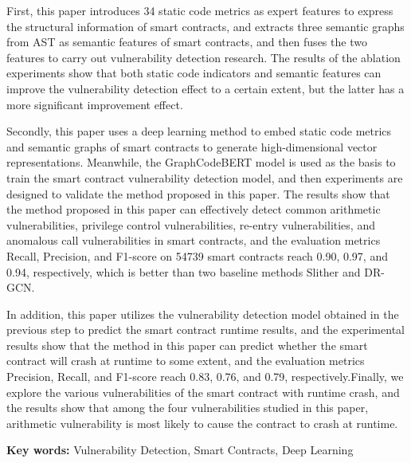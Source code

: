 First, this paper introduces 34 static code metrics as expert features to express the structural information of smart contracts, and extracts three semantic graphs from AST as semantic features of smart contracts, and then fuses the two features to carry out vulnerability detection research. The results of the ablation experiments show that both static code indicators and semantic features can improve the vulnerability detection effect to a certain extent, but the latter has a more significant improvement effect.

Secondly, this paper uses a deep learning method to embed static code metrics and semantic graphs of smart contracts to generate high-dimensional vector representations. Meanwhile, the GraphCodeBERT model is used as the basis to train the smart contract vulnerability detection model, and then experiments are designed to validate the method proposed in this paper. The results show that the method proposed in this paper can effectively detect common arithmetic vulnerabilities, privilege control vulnerabilities, re-entry vulnerabilities, and anomalous call vulnerabilities in smart contracts, and the evaluation metrics Recall, Precision, and F1-score on \num{54739} smart contracts reach 0.90, 0.97, and 0.94, respectively, which is better than two baseline methods Slither and DR-GCN.
    
In addition, this paper utilizes the vulnerability detection model obtained in the previous step to predict the smart contract runtime results, and the experimental results show that the method in this paper can predict whether the smart contract will crash at runtime to some extent, and the evaluation metrics Precision, Recall, and F1-score reach 0.83, 0.76, and 0.79, respectively.Finally, we explore the various vulnerabilities of the smart contract with runtime crash, and the results show that among the four vulnerabilities studied in this paper, arithmetic vulnerability is most likely to cause the contract to crash at runtime.

\hspace*{\fill}

\noindent \textbf{Key words: } Vulnerability Detection, Smart Contracts, Deep Learning
